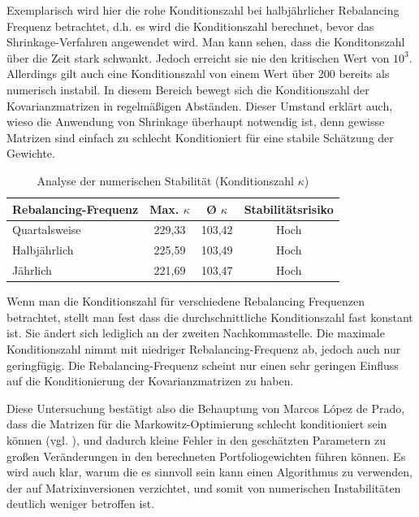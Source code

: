 \documentclass[parskip=half]{scrartcl}
\begin{document}
	Exemplarisch wird hier die rohe Konditionszahl bei halbjährlicher Rebalancing Frequenz betrachtet, d.h. es wird die Konditionszahl berechnet, bevor das Shrinkage-Verfahren angewendet wird. Man kann sehen, dass die Konditonszahl über die Zeit stark schwankt. Jedoch erreicht sie nie den kritischen Wert von $10^3$. Allerdings gilt auch eine Konditionszahl von einem Wert über 200 bereits als numerisch instabil. In diesem Bereich bewegt sich die Konditionszahl der Kovarianzmatrizen in regelmäßigen Abständen. Dieser Umstand erklärt auch, wieso die Anwendung von Shrinkage überhaupt notwendig ist, denn gewisse Matrizen sind einfach zu schlecht Konditioniert für eine stabile Schätzung der Gewichte.
	
	\begin{table}[H]
		\centering
		\caption{Analyse der numerischen Stabilität (Konditionszahl $\kappa$)}
		\label{tab:stabilitaet_vergleich}
		\begin{tabular}{@{}lccc@{}}
			\toprule
			\textbf{Rebalancing-Frequenz} & \textbf{Max. $\kappa$} & \textbf{Ø $\kappa$} & \textbf{Stabilitätsrisiko} \\ \midrule
			Quartalsweise & 229,33 & 103,42 & Hoch \\
			Halbjährlich & 225,59 & 103,49 & Hoch \\
			Jährlich & 221,69 & 103,47 & Hoch \\ \bottomrule
		\end{tabular}
	\end{table}
	
	Wenn man die Konditionszahl für verschiedene Rebalancing Frequenzen betrachtet, stellt man fest dass die durchschnittliche Konditionszahl fast konstant ist. Sie ändert sich lediglich an der zweiten Nachkommastelle. Die maximale Konditionszahl nimmt mit niedriger Rebalancing-Frequenz ab, jedoch auch nur geringfügig. Die Rebalancing-Frequenz scheint nur einen sehr geringen Einfluss auf die Konditionierung der Kovarianzmatrizen zu haben.
	
	Diese Untersuchung bestätigt also die Behauptung von Marcos López de Prado, dass die Matrizen für die Markowitz-Optimierung schlecht konditioniert sein können (vgl. \textcite[222]{Lopez}), und dadurch kleine Fehler in den geschätzten Parametern zu großen Veränderungen in den berechneten Portfoliogewichten führen können. Es wird auch klar, warum die es sinnvoll sein kann einen Algorithmus zu verwenden, der auf Matrixinversionen verzichtet, und somit von numerischen Instabilitäten deutlich weniger betroffen ist.
	
\end{document}
